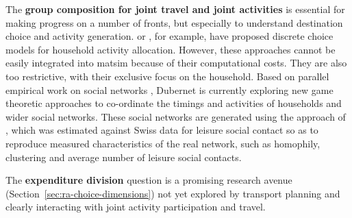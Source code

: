 The \textbf{group composition for joint travel and joint activities} is essential for making progress on a number of fronts, but especially to understand destination choice and activity generation. 
\citet{GliebeKoppelman_Transportation_2005} or
\citet{ZhangEtAl_TransResB_2005},
for example, have proposed discrete choice models for household activity allocation. However, these approaches cannot be easily integrated into \gls{matsim} because of their computational costs. They are also too restrictive, with their exclusive focus on the household.  Based on parallel empirical work on social networks 
\citep[see][]{LarsenEtAl_MOB_2006,KowaldEtAl_JTG_2013},
Dubernet is currently exploring new game theoretic approaches to co-ordinate the timings and activities of households and wider social networks. 
These social networks are generated using the approach of \cite{ArentzeEtAl_SN_2013}, which was estimated against Swiss data for leisure social contact \citep{KowaldAxhausen_EnvPlannA_2012} so as to reproduce measured characteristics of the real network, such as homophily, clustering and average number of leisure social contacts.

The \textbf{expenditure division} question is a promising research avenue (Section~\ref{sec:ra-choice-dimensions}) not yet explored by transport planning and clearly interacting with joint activity participation and travel. 


